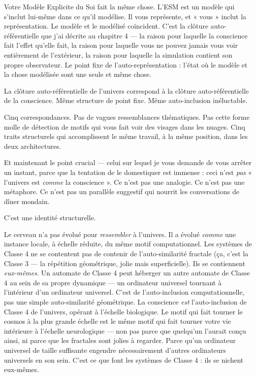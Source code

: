\documentclass[11pt, twoside, openright]{book}
\begin{document}
Votre Modèle Explicite du Soi fait la même chose. L'ESM est un modèle qui s'inclut lui-même dans ce qu'il modélise. Il vous représente, et « vous » inclut la représentation. Le modèle et le modélisé coïncident. C'est la clôture auto-référentielle que j'ai décrite au chapitre 4 --- la raison pour laquelle la conscience fait l'effet qu'elle fait, la raison pour laquelle vous ne pouvez jamais vous voir entièrement de l'extérieur, la raison pour laquelle la simulation contient son propre observateur. Le point fixe de l'auto-représentation : l'état où le modèle et la chose modélisée sont une seule et même chose.

La clôture auto-référentielle de l'univers correspond à la clôture auto-référentielle de la conscience. Même structure de point fixe. Même auto-inclusion inéluctable.

Cinq correspondances. Pas de vagues ressemblances thématiques. Pas cette forme molle de détection de motifs qui vous fait voir des visages dans les nuages. Cinq traits structurels qui accomplissent le même travail, à la même position, dans les deux architectures.

Et maintenant le point crucial --- celui sur lequel je vous demande de vous arrêter un instant, parce que la tentation de le domestiquer est immense : ceci n'est \textit{pas} « l'univers est \textit{comme} la conscience ». Ce n'est pas une analogie. Ce n'est pas une métaphore. Ce n'est pas un parallèle suggestif qui nourrit les conversations de dîner mondain.

C'est une identité structurelle.

Le cerveau n'a pas évolué pour \textit{ressembler} à l'univers. Il a évolué \textit{comme} une instance locale, à échelle réduite, du même motif computationnel. Les systèmes de Classe 4 ne se contentent pas de contenir de l'auto-similarité fractale (ça, c'est la Classe 3 --- la répétition géométrique, jolie mais superficielle). Ils se contiennent \textit{eux-mêmes}. Un automate de Classe 4 peut héberger un autre automate de Classe 4 au sein de sa propre dynamique --- un ordinateur universel tournant à l'intérieur d'un ordinateur universel. C'est de l'auto-inclusion computationnelle, pas une simple auto-similarité géométrique. La conscience \textit{est} l'auto-inclusion de Classe 4 de l'univers, opérant à l'échelle biologique. Le motif qui fait tourner le cosmos à la plus grande échelle est le même motif qui fait tourner votre vie intérieure à l'échelle neurologique --- non pas parce que quelqu'un l'aurait conçu ainsi, ni parce que les fractales sont jolies à regarder. Parce qu'un ordinateur universel de taille suffisante engendre nécessairement d'autres ordinateurs universels en son sein. C'est ce que font les systèmes de Classe 4 : ils se nichent eux-mêmes.
\end{document}
